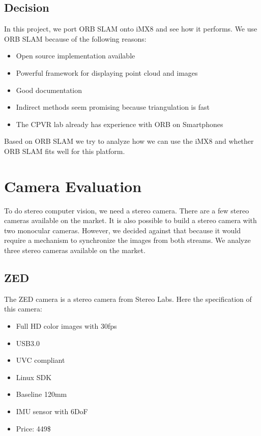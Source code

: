 \documentclass[11pt,a4paper,titlepage,oneside]{report}
\begin{document}
\section{Decision}

In this project, we port ORB SLAM onto iMX8 and see how it performs. We use ORB SLAM because of the following reasons:
\begin{itemize}
	\item Open source implementation available
	\item Powerful framework for displaying point cloud and images
	\item Good documentation
	\item Indirect methods seem promising because triangulation is fast
	\item The CPVR lab already has experience with ORB on Smartphones
\end{itemize}

Based on ORB SLAM we try to analyze how we can use the iMX8 and whether ORB SLAM fits well for this platform.

\chapter{Camera Evaluation}

To do stereo computer vision, we need a stereo camera. There are a few stereo cameras available on the market. It is also possible to build a stereo camera with two monocular cameras. However, we decided against that because it would require a mechanism to synchronize the images from both streams. We analyze three stereo cameras available on the market.

\section{ZED}
The ZED camera \cite{zed} is a stereo camera from Stereo Labs. Here the specification of this camera:
\begin{itemize}
	\item Full HD color images with 30fps
	\item USB3.0
	\item UVC compliant
	\item Linux SDK
	\item Baseline 120mm
	\item IMU sensor with 6DoF
	\item Price: 449\$
\end{itemize}
\end{document}
